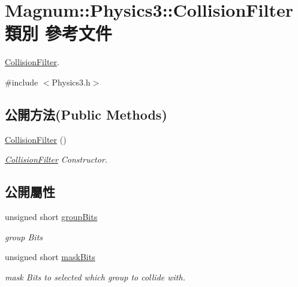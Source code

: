 \hypertarget{class_magnum_1_1_physics3_1_1_collision_filter}{}\section{Magnum\+:\+:Physics3\+:\+:Collision\+Filter 類別 參考文件}
\label{class_magnum_1_1_physics3_1_1_collision_filter}


\hyperlink{class_magnum_1_1_physics3_1_1_collision_filter}{Collision\+Filter}.  




{\ttfamily \#include $<$Physics3.\+h$>$}

\subsection*{公開方法(Public Methods)}
\begin{DoxyCompactItemize}
\item 
\hyperlink{class_magnum_1_1_physics3_1_1_collision_filter_a3089411f79993ae60dd6703cfce2cdc4}{Collision\+Filter} ()
\begin{DoxyCompactList}\small\item\em \hyperlink{class_magnum_1_1_physics3_1_1_collision_filter}{Collision\+Filter} Constructor. \end{DoxyCompactList}\end{DoxyCompactItemize}
\subsection*{公開屬性}
\begin{DoxyCompactItemize}
\item 
unsigned short \hyperlink{class_magnum_1_1_physics3_1_1_collision_filter_a1f5175deb5a598b24e6e1bb487a9c224}{group\+Bits}\hypertarget{class_magnum_1_1_physics3_1_1_collision_filter_a1f5175deb5a598b24e6e1bb487a9c224}{}\label{class_magnum_1_1_physics3_1_1_collision_filter_a1f5175deb5a598b24e6e1bb487a9c224}

\begin{DoxyCompactList}\small\item\em group Bits \end{DoxyCompactList}\item 
unsigned short \hyperlink{class_magnum_1_1_physics3_1_1_collision_filter_abb0c2143e9947c8949e3ebea123ddcee}{mask\+Bits}
\begin{DoxyCompactList}\small\item\em mask Bits to selected which group to collide with. \end{DoxyCompactList}\end{DoxyCompactItemize}


